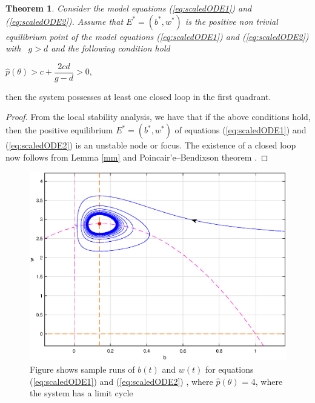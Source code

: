 \documentclass[12pt]{article}
\newtheorem{theorem}{Theorem}[section]
\begin{document}
\begin{theorem}
   Consider the model equations (\ref{eq:scaledODE1}) and
  (\ref{eq:scaledODE2}). Assume that $E^{\ast }=(b^{\ast },w^{\ast })$
  is the positive non trivial equilibrium point of the model equations
  (\ref{eq:scaledODE1}) and (\ref{eq:scaledODE2}) with \ $g>d$ and the
  following condition hold
\end{theorem}

\begin{center}
$%
\hat{p}(\theta )>c+\dfrac{2cd}{g-d}>0,$
\end{center}

then the system possesses at least one closed loop in the first quadrant.

\begin{proof}
  From the local stability analysis, we have that if the above
  conditions hold, then the positive equilibrium
  $E^{\ast }=(b^{\ast },w^{\ast })$ of equations (\ref{eq:scaledODE1})
  and (\ref{eq:scaledODE2}) is an unstable node or focus. The
  existence of a closed loop now follows from Lemma \ref{mm} and
  Poincair'e--Bendixson theorem \cite{nonlinearChaos}.
\end{proof}

\begin{figure}[!htp]
\begin{center}
\includegraphics[scale=0.3]{img/lim.eps}  

\end{center}

\caption{Figure shows sample runs of $b(t)$ and $w(t)$ for equations
  (\ref{eq:scaledODE1}) and (\ref{eq:scaledODE2}) , where
  $\hat{p}(\theta )$ = 4, where the system has a limit cycle }
      \label{fig:lim}
\end{figure}
\end{document}
